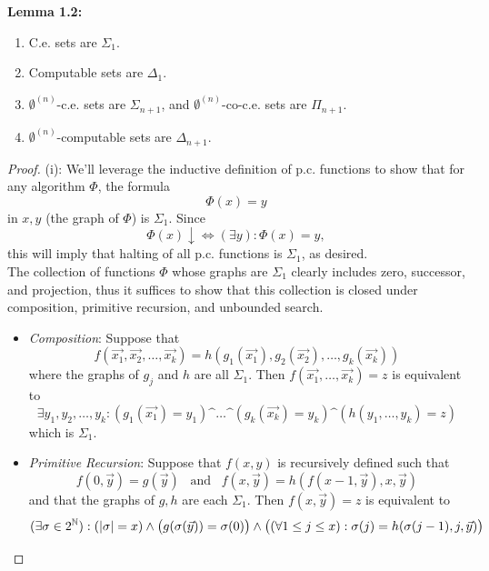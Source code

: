 \documentclass{amsart}
\begin{document}
	\noindent \textbf{Lemma 1.2:} 
	\begin{enumerate}[label=(\roman*)]
		\item C.e. sets are $\Sigma_1$.
		\item Computable sets are $\Delta_1$.
		\item $\emptyset^{(n)}$-c.e. sets are $\Sigma_{n+1}$, and $\emptyset^{(n)}$-co-c.e. sets are $\Pi_{n+1}$.
		\item $\emptyset^{(n)}$-computable sets are $\Delta_{n+1}$.
	\end{enumerate}
	\begin{proof}
		(i): We'll leverage the inductive definition of p.c. functions to show that for any algorithm $\Phi$, the formula
		$$
		\Phi(x) = y
		$$
		in $x,y$ (the graph of $\Phi$) is $\Sigma_1$. Since 
		$$\Phi(x)\downarrow \iff (\exists y): \Phi(x)=y,$$ 
		this will imply that halting of all p.c. functions is $\Sigma_1$, as desired.\\
		\indent The collection of functions $\Phi$ whose graphs are $\Sigma_1$ clearly includes zero, successor, and projection, thus it suffices to show that this collection is closed under composition, primitive recursion, and unbounded search.
		\begin{itemize}
			\item \textit{Composition}: Suppose that $$f(\vec{x_1},\vec{x_2},\dots,\vec{x_k}) = h(g_1(\vec{x_1}),g_2(\vec{x_2}),\dots,g_k(\vec{x_k}))$$ where the graphs of $g_j$ and $h$ are all $\Sigma_1$. Then $f(\vec{x_1},\dots,\vec{x_k})=z$ is equivalent to
			$$
			\exists y_1,y_2,\dots,y_k: (g_1(\vec{x_1}) =y_1)\^ \dots \^ (g_k(\vec{x_k})=y_k) \^ (h(y_1,\dots,y_k)=z)
			$$
			which is $\Sigma_1$.
			\item \textit{Primitive Recursion}: Suppose that $f(x,y)$ is recursively defined such that
			$$f(0,\vec{y})= g(\vec{y})\;\;\; \text{and} \;\;\; f(x,\vec{y})=h(f(x-1,\vec{y}),x,\vec{y})$$ 
			and that the graphs of $g,h$ are each $\Sigma_1$. 
			Then $f(x,\vec{y})=z$ is equivalent to
			$$
			(\exists \sigma \in 2^{\mathbb{N}}): (|\sigma|=x) \wedge \big(g(\sigma(\vec{y}))=\sigma(0)\big) \wedge \big((\forall 1\leq j \leq x): \sigma(j) = h(\sigma(j-1),j,\vec{y})\big)
			$$

\end{itemize}
\end{proof}
\end{document}
